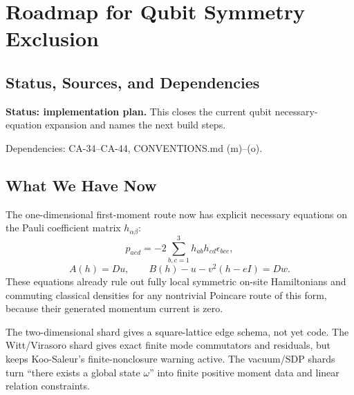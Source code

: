
\section{Roadmap for Qubit Symmetry Exclusion}
\label{sec:qubit-symmetry-exclusion-roadmap}

\subsection{Status, Sources, and Dependencies}

\textbf{Status: implementation plan.}  This closes the current qubit
necessary-equation expansion and names the next build steps.

Dependencies: CA-34--CA-44, CONVENTIONS.md (m)--(o).


\subsection{What We Have Now}

The one-dimensional first-moment route now has explicit necessary equations on
the Pauli coefficient matrix \(h_{\alpha\beta}\):
\[
  p_{aed}
  =
  -2\sum_{b,c=1}^3h_{ab}h_{cd}\epsilon_{bce},
\]
\[
  A(h)=D u,
  \qquad
  B(h)-u-v^2(h-eI)=D w.
\]
These equations already rule out fully local symmetric on-site Hamiltonians and
commuting classical densities for any nontrivial Poincare route of this form,
because their generated momentum current is zero.

The two-dimensional shard gives a square-lattice edge schema, not yet code.
The Witt/Virasoro shard gives exact finite mode commutators and residuals, but
keeps Koo-Saleur's finite-nonclosure warning active.  The vacuum/SDP shards turn
``there exists a global state \(\omega\)'' into finite positive moment data and
linear relation constraints.

